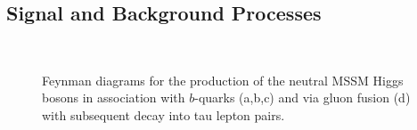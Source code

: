 \subsection{Signal and Background Processes}

\begin{figure}[tp]
     \begin{center}
     \hspace{0.2cm}	
     	\hspace{0.2cm}\\	
     \end{center}
    \caption{Feynman diagrams for the production of the neutral MSSM Higgs bosons in association with  $b$-quarks (a,b,c) and via gluon fusion (d) 
	with subsequent decay into tau lepton pairs.}
   \label{fig:feyndiagSignal}
\end{figure}

